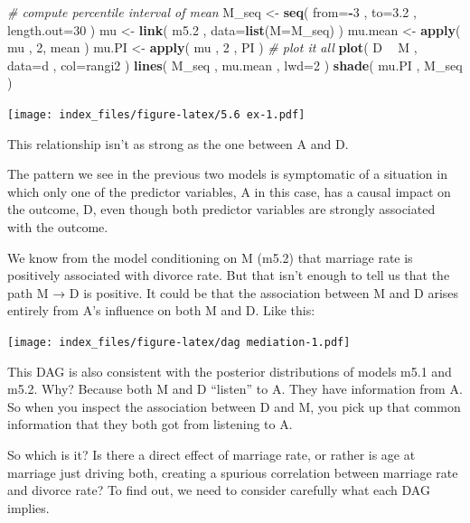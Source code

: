 \documentclass[
]{article}
\newenvironment{Shaded}{\begin{snugshade}}{\end{snugshade}}
\newcommand{\CommentTok}[1]{\textcolor[rgb]{0.56,0.35,0.01}{\textit{#1}}}
\newcommand{\DataTypeTok}[1]{\textcolor[rgb]{0.13,0.29,0.53}{#1}}
\newcommand{\DecValTok}[1]{\textcolor[rgb]{0.00,0.00,0.81}{#1}}
\newcommand{\FloatTok}[1]{\textcolor[rgb]{0.00,0.00,0.81}{#1}}
\newcommand{\KeywordTok}[1]{\textcolor[rgb]{0.13,0.29,0.53}{\textbf{#1}}}
\newcommand{\NormalTok}[1]{#1}
\newcommand{\OperatorTok}[1]{\textcolor[rgb]{0.81,0.36,0.00}{\textbf{#1}}}
\newcommand{\StringTok}[1]{\textcolor[rgb]{0.31,0.60,0.02}{#1}}
\begin{document}
\begin{Shaded}
\begin{Highlighting}[]
\CommentTok{# compute percentile interval of mean}
\NormalTok{M_seq <-}\StringTok{ }\KeywordTok{seq}\NormalTok{( }\DataTypeTok{from=}\OperatorTok{-}\DecValTok{3}\NormalTok{ , }\DataTypeTok{to=}\FloatTok{3.2}\NormalTok{ , }\DataTypeTok{length.out=}\DecValTok{30}\NormalTok{ )}
\NormalTok{mu <-}\StringTok{ }\KeywordTok{link}\NormalTok{( m5}\FloatTok{.2}\NormalTok{ , }\DataTypeTok{data=}\KeywordTok{list}\NormalTok{(}\DataTypeTok{M=}\NormalTok{M_seq) )}
\NormalTok{mu.mean <-}\StringTok{ }\KeywordTok{apply}\NormalTok{( mu , }\DecValTok{2}\NormalTok{, mean )}
\NormalTok{mu.PI <-}\StringTok{ }\KeywordTok{apply}\NormalTok{( mu , }\DecValTok{2}\NormalTok{ , PI )}
\CommentTok{# plot it all}
\KeywordTok{plot}\NormalTok{( D }\OperatorTok{~}\StringTok{ }\NormalTok{M , }\DataTypeTok{data=}\NormalTok{d , }\DataTypeTok{col=}\NormalTok{rangi2 )}
\KeywordTok{lines}\NormalTok{( M_seq , mu.mean , }\DataTypeTok{lwd=}\DecValTok{2}\NormalTok{ )}
\KeywordTok{shade}\NormalTok{( mu.PI , M_seq )}
\end{Highlighting}
\end{Shaded}

\texttt{[image: index\_files/figure-latex/5.6 ex-1.pdf]}

This relationship isn't as strong as the one between A and D.

The pattern we see in the previous two models is symptomatic of a
situation in which only one of the predictor variables, A in this case,
has a causal impact on the outcome, D, even though both predictor
variables are strongly associated with the outcome.

We know from the model conditioning on M (m5.2) that marriage rate is
positively associated with divorce rate. But that isn't enough to tell
us that the path M → D is positive. It could be that the association
between M and D arises entirely from A's influence on both M and D. Like
this:

\texttt{[image: index\_files/figure-latex/dag mediation-1.pdf]}

This DAG is also consistent with the posterior distributions of models
m5.1 and m5.2. Why? Because both M and D ``listen'' to A. They have
information from A. So when you inspect the association between D and M,
you pick up that common information that they both got from listening to
A.

So which is it? Is there a direct effect of marriage rate, or rather is
age at marriage just driving both, creating a spurious correlation
between marriage rate and divorce rate? To find out, we need to consider
carefully what each DAG implies.
\end{document}

